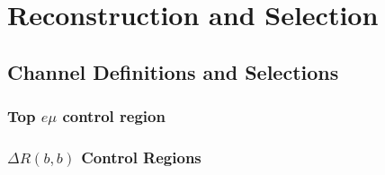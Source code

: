 \chapter{Reconstruction and Selection}%
\label{sec:method}
\section{Channel Definitions and Selections}%
\label{sec:channels-and-selections}
\subsection{Top \texorpdfstring{$e \mu$}{e mu} control region}%
\label{sec:topemucr}
\subsection{\texorpdfstring{$\Delta R(b,b)$}{DRbb} Control Regions}%
\label{sec:control-region-defintions}


